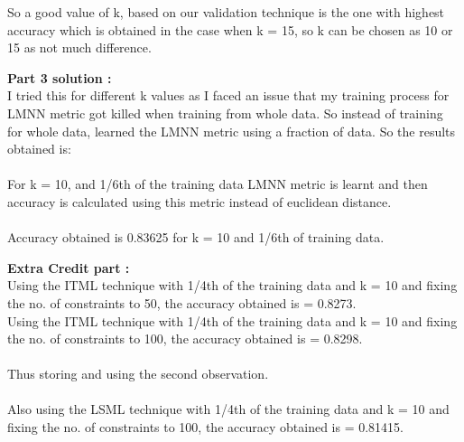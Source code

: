 \documentclass[a4paper,11pt]{article}
\begin{document}
\begin{mlsolution}
So a good value of k, based on our validation technique is the one with highest accuracy which is obtained in the case when k = 15, so k can be chosen as 10 or 15 as not much difference.

\newpage

\textbf{Part 3 solution :}\\

I tried this for different k values as I faced an issue that my training process for LMNN metric got killed when training from whole data. So instead of training for whole data, learned the LMNN metric using a fraction of data. So the results obtained is:\\\\For k = 10, and 1/6th of the training data LMNN metric is learnt and then accuracy is calculated using this metric instead of euclidean distance.\\\\Accuracy obtained is 0.83625 for k = 10 and 1/6th of training data.

\newpage

\textbf{Extra Credit part :}\\

Using the ITML technique with 1/4th of the training data and k = 10 and fixing the no. of constraints to 50, the accuracy obtained is = 0.8273.\\Using the ITML technique with 1/4th of the training data and k = 10 and fixing the no. of constraints to 100, the accuracy obtained is = 0.8298.\\\\Thus storing and using the second observation.
\\\\Also using the LSML technique with 1/4th of the training data and k = 10 and fixing the no. of constraints to 100, the accuracy obtained is =  0.81415.

\end{mlsolution}
\end{document}
